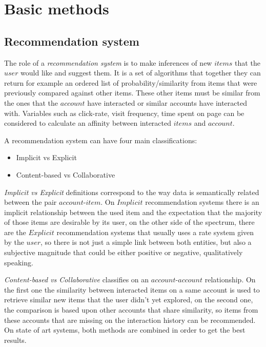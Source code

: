 \documentclass[ecp,tc,english]{iiufrgs}
\begin{document}
    \section{Basic methods} \label{basic_methods}
        \subsection{Recommendation system}
        The role of a \textit{recommendation system} is to make inferences of new \(items\) that the \(user\) would like and suggest them. It is a set of algorithms that together they can return for example an ordered list of probability/similarity from items that were previously compared against other items. These other items must be similar from the ones that the \(account\) have interacted or similar accounts have interacted with.
        Variables such as click-rate, visit frequency, time spent on page can be considered to calculate an affinity between interacted \(items\) and \(account\).

        A recommendation system can have four main classifications:
        \begin{itemize} 
            \item Implicit vs Explicit
            \item Content-based vs Collaborative
        \end{itemize}

        \textit{Implicit vs Explicit} definitions correspond to the way data is semantically related between the pair \(account\)-\(item\). On \(Implicit\) recommendation systems there is an implicit relationship between the used item and the expectation that the majority of those items are desirable by its user, on the other side of the spectrum, there are the \(Explicit\) recommendation systems that usually uses a rate system given by the \(user\), so there is not just a simple link between both entities, but also a subjective magnitude that could be either positive or negative, qualitatively speaking.

        \textit{Content-based vs Collaborative} classifies on an \(account\)-\(account\) relationship. On the first one the similarity between interacted items on a same account is used to retrieve similar new items that the user didn't yet explored, on the second one, the comparison is based upon other accounts that share similarity, so items from these accounts that are missing on the interaction history can be recommended. On state of art systems, both methods are combined in order to get the best results.    
        
\end{document}
